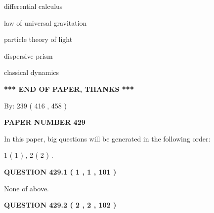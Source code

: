 \documentclass[12pt]{article}
\begin{document}
 
differential calculus
 
 
law of universal gravitation
 
 
particle theory of light
 
 
dispersive prism
 
 
classical dynamics
 
 
 
 
   
   
\vspace{1.0in} 
{\textbf{\large{ *** END OF PAPER, THANKS *** }}} 
   
   
\hspace{1.0in} By: 
 239 ( 416 ,  458 )
   
   
   
   
\newpage 
\setcounter{page}{ 
   429001 } 
   
   
   
   
 {\textbf{ \Large{ PAPER NUMBER  429  }}}
   
   
\vspace{0.2in}
   
   
   
   
   
\vspace{0.2in}
   
In this paper, big questions will be generated in the following order: 
   
   
   1 ( 1 )
 ,
   2 ( 2 )
 .
  
\vspace{0.2in}
  
{\textbf{\Large{QUESTION
429.1 
 ( 1 , 1 , 101 )
}}}
  
  
 
 
\noindent{}
 
 
 None of above.
 
 
 
 
  
\vspace{0.2in}
  
{\textbf{\Large{QUESTION
429.2 
 ( 2 , 2 , 102 )
}}}
  
  
 
\end{document}

